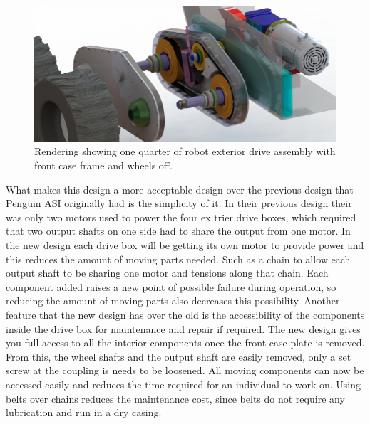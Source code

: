 \begin{figure}[htbp]
\includegraphics[width=\linewidth]{images/drive_box_presentation_rndr.jpg}
\caption[Quarter view of robot]{Rendering showing one quarter of robot exterior drive assembly with front case frame and wheels off. }
\label{fig:quart_assem}
\end{figure}

What makes this design a more acceptable design over the previous design that Penguin ASI originally had is the simplicity of it. In their previous design their was only two motors used to power the four ex trier drive boxes, which required that two output shafts on one side had to share the output from one motor. In the new design each drive box will be getting its own motor to provide power and this reduces the amount of moving parts needed. Such as a chain to allow each output shaft to be sharing one motor and tensions along that chain. Each component added raises a new point of possible failure during operation, so reducing the amount of moving parts also decreases this possibility. Another feature that the new design has over the old is the accessibility of the components inside the drive box for maintenance and repair if required. The new design gives you full access to all the interior components once the front case plate is removed. From this,  the wheel shafts and the output shaft are easily removed, only a set screw at the coupling is needs to be loosened. All moving components can now be accessed easily and reduces the time required for an individual to work on. Using belts over chains reduces the maintenance cost, since belts do not require any lubrication and run in a dry casing.


